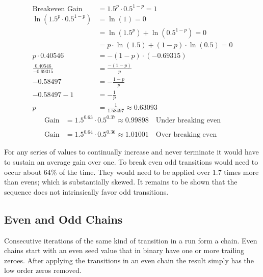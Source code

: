 \documentclass[letterpaper]{article}
\begin{document}
\begin{multicols}{2}
    \begin{align*}
        \text{Breakeven Gain}                   & = 1.5^p \cdot 0.5^{1-p} = 1                   \\
        \ln\left( 1.5^p \cdot 0.5^{1-p} \right) & = \ln(1) = 0                                  \\
                                                & = \ln(1.5^p) + \ln(0.5^{1-p}) = 0             \\
                                                & = p \cdot \ln(1.5) + (1-p) \cdot \ln(0.5) = 0 \\
        p \cdot 0.40546                         & = -(1-p) \cdot (-0.69315)                     \\
        \frac{0.40546}{-0.69315}                & = \frac{-(1-p)}{p}                            \\
        -0.58497                                & = -\frac{1-p}{p}                              \\
        -0.58497 - 1                            & = -\frac{1}{p}                                \\
        p                                       & = \frac{1}{1.58497} \approx 0.63093
    \end{align*}
    \begin{align*}
        \text{Gain} & = 1.5^{0.63} \cdot 0.5^{0.37} \approx 0.99898 \quad \text{Under breaking even} \\
        \\
        \text{Gain} & = 1.5^{0.64} \cdot 0.5^{0.36} \approx 1.01001 \quad \text{Over breaking even}
    \end{align*}

    For any series of values to continually increase and never terminate it would have to sustain an average gain over one. To break even odd transitions would need to occur about 64\% of the time. They would need to be applied over 1.7 times more than evens; which is substantially skewed. It remains to be shown that the sequence does not intrinsically favor odd transitions.

    \subsection{Even and Odd Chains}

    Consecutive iterations of the same kind of transition in a run form a chain. Even chains start with an even seed value that in binary have one or more trailing zeroes. After applying the transitions in an even chain the result simply has the low order zeros removed.


\end{multicols}
\end{document}
